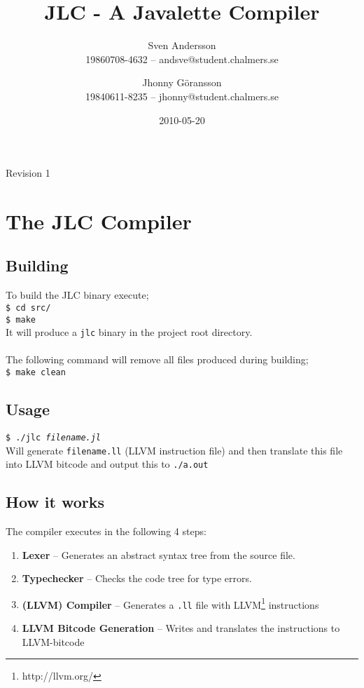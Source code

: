\documentclass[]{article}
\title{JLC - A Javalette Compiler}
\author{Sven Andersson\\19860708-4632 -- andsve@student.chalmers.se
        \and Jhonny Göransson\\19840611-8235 -- jhonny@student.chalmers.se}
\date{2010-05-20}
\begin{document}
\ifpdf
{}
\else
{}
\fi

\maketitle
\begin{center}
  Revision 1
\end{center}



\section{The JLC Compiler}
  \subsection*{Building}
    To build the JLC binary execute;\\
    \texttt{\$ cd src/}\\
    \texttt{\$ make}\\
    It will produce a \texttt{jlc} binary in the project root directory.\\
    \\
    The following command will remove all files produced during building;\\
    \texttt{\$ make clean}

  \subsection*{Usage}
    \texttt{\$ ./jlc \textit{filename.jl}}\\
    Will generate \texttt{filename.ll} (LLVM instruction file) and then translate this file into LLVM bitcode and output this to \texttt{./a.out}
  
  \subsection*{How it works}
    The compiler executes in the following 4 steps:
    \begin{enumerate}
      \item \textbf{Lexer} -- Generates an abstract syntax tree from the source file.
      \item \textbf{Typechecker} -- Checks the code tree for type errors.
      \item \textbf{(LLVM) Compiler} -- Generates a \texttt{.ll} file with LLVM\footnote{http://llvm.org/} instructions
      \item \textbf{LLVM Bitcode Generation} -- Writes and translates the instructions to LLVM-bitcode
    \end{enumerate}
\end{document}
